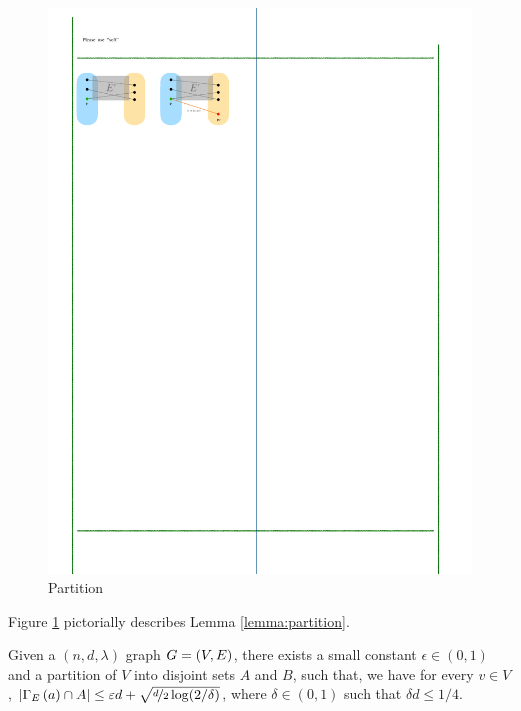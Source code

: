 \documentclass[11pt]{article}
\newcommand{\EnDeeLambda}{(n, d, \lambda)}
\newcommand{\EdgesShort}{E}
\begin{document}
\begin{figure}
	\includegraphics{assets/non-blocking-networks.pdf}
	\caption{Partition }
	\label{fig:partition}
\end{figure}

Figure \ref{fig:partition} pictorially describes Lemma \ref{lemma:partition}.

\begin{lemma}\label{lemma:partition}Given a $\EnDeeLambda$ graph $G = (V, E)$, there exists a small constant $\epsilon \in (0,1)$ and a partition of $V$ into disjoint sets $A$ and $B$, such that, we have for every $v \in V$, $|\Neighbourhood{\EdgesShort}{a} \cap A| \leq \epsilon d + \sqrt{\nicefrac{d}{2}\log (2/\delta)}$,
where $\delta \in (0,1)$ such that $\delta d \leq 1/4$.	
\end{lemma}
\end{document}
